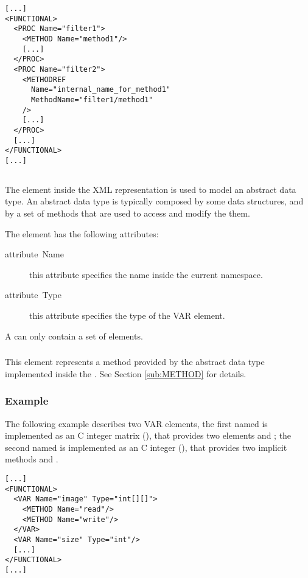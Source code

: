 \begin{lstlisting}
[...]
<FUNCTIONAL>
  <PROC Name="filter1">
    <METHOD Name="method1"/>
    [...]
  </PROC>
  <PROC Name="filter2">
    <METHODREF
      Name="internal_name_for_method1"
      MethodName="filter1/method1"
    />
    [...]
  </PROC>
  [...]
</FUNCTIONAL>
[...]
\end{lstlisting}



\subsection{}
\label{sub:VAR}

The  element inside the XML representation is used to model
an abstract data type. An abstract data type is typically composed by
some data structures, and by a set of methods that are used to access
and modify the them.

The  element has the following attributes:
\begin{description}
\item [{attribute~Name}] this attribute specifies the  name
  inside the current namespace.
\item [{attribute~Type}] this attribute specifies the type of the VAR
  element.
\end{description}

A  can only contain a set of  elements.

\subsubsection{}

This element represents a method provided by the abstract data type
implemented inside the . See Section \ref{sub:METHOD} for
details.


\subsubsection{Example}

The following example describes two VAR elements, the first named
 is implemented as an C integer matrix (),
that provides two elements  and ; the second
named  is implemented as an C integer (), that
provides two implicit methods  and .

\begin{lstlisting}
[...]
<FUNCTIONAL>
  <VAR Name="image" Type="int[][]">
    <METHOD Name="read"/>
    <METHOD Name="write"/>
  </VAR>
  <VAR Name="size" Type="int"/>
  [...]
</FUNCTIONAL>
[...]
\end{lstlisting}

